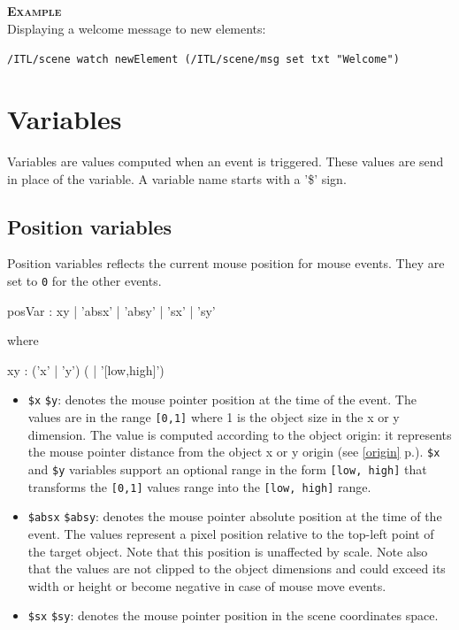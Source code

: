 \documentclass[a4paper,twoside]{report}
\newcommand{\sublevel}[1]	{\section{#1}}
\newcommand{\subsublevel}[1]	{\subsection{#1}}
\newcommand{\fullref}[1]	{\ref{#1} p.\pageref{#1}}
\newcommand{\OSC}[1]		{\texttt{#1}}
\newcommand{\values}[1]	{\texttt{#1}}
\newcommand{\example}		{\textbf{\hspace{-1.5cm}\textbf{\textsc{Example }}}}
\newcommand{\sample}	[1]			{\vspace{-2mm}\begin{center}\colorbox{mygrey}{
								\begin{minipage}[t]{0.9\columnwidth} 
								{\small \texttt{#1}}
								\end{minipage}}\end{center}}
\begin{document}
\example \\
Displaying a welcome message to new elements:
\sample{/ITL/scene watch newElement (/ITL/scene/msg set txt "Welcome")}

\sublevel{Variables}
\label{interactvar}

Variables are values computed when an event is triggered. These values are send in place of the variable. A variable name starts with a '\$' sign. 

\subsublevel{Position variables}
\label{posvar}

Position variables reflects the current mouse position for mouse events. They are set to \values{0} for the other events. 

\begin{rail} 
posVar : xy | 'absx' | 'absy' | 'sx' | 'sy' 
\end{rail}

where
\begin{rail} 
xy : ('x' | 'y') ( | '[low,high]') 
\end{rail}

\begin{itemize}
\item \OSC{\$x} \OSC{\$y}: denotes the mouse pointer position at the time of the event. The values are in the range \values{[0,1]} where 1 is the object size in the x or y dimension. The value is computed according to the object origin: it represents the mouse pointer distance from the object x or y origin (see \fullref{origin}). \OSC{\$x} and \OSC{\$y} variables support an optional range in the form \OSC{[low, high]} that transforms the \values{[0,1]}  values range into the \values{[low, high]} range.

\item \OSC{\$absx} \OSC{\$absy}: denotes the mouse pointer absolute position at the time of the event. The values represent a pixel position relative to the top-left point of the target object. Note that this position is unaffected by scale. 
Note also that the values are not clipped to the object dimensions and could exceed its width or height or become negative in case of mouse move events.

\item \OSC{\$sx} \OSC{\$sy}: denotes the mouse pointer position in the scene coordinates space. 
\end{itemize}
\end{document}

